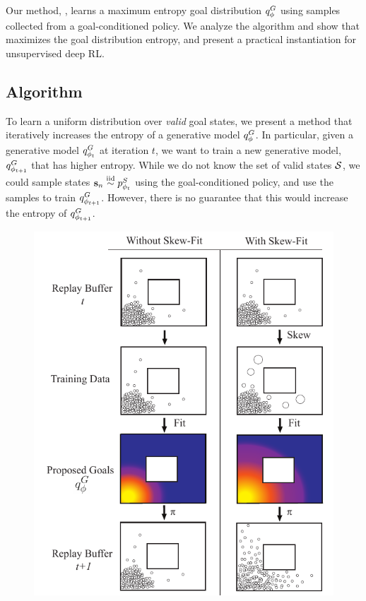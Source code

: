 Our method, \METHOD, learns a maximum entropy goal distribution ${q^G_{{\phi}}}$ using samples collected from a goal-conditioned policy.
We analyze the algorithm and show that \METHOD maximizes the goal distribution entropy, and present a practical instantiation for unsupervised deep RL.

\subsection{\METHOD Algorithm}\label{sec:method-description}
To learn a uniform distribution over \emph{valid} goal states, we present a method that iteratively increases the entropy of a generative model ${q^G_{{\phi}}}$.
In particular, given a generative model ${q^G_{{\phi}_t}}$ at iteration $t$, we want to train a new generative model, ${q^G_{{\phi}_{t+1}}}$ that has higher entropy.
While we do not know the set of valid states ${\mathcal{S}}$, we could sample states \mbox{$\mathbf{s}_n \overset{\text{iid}}{\sim} {p^S_{{\phi}_t}}$} using the goal-conditioned policy,
and use the samples to train ${q^G_{{\phi}_{t+1}}}$.
However, there is no guarantee that this would increase the entropy of ${q^G_{{\phi}_{t+1}}}$.

\begin{figure}[ht]
    \centering
    \includegraphics[width=\linewidth]{skewfit/figures/skewfitfigure_vertical_q_phi_g.pdf}
    \label{fig:main-fig}
\end{figure}

